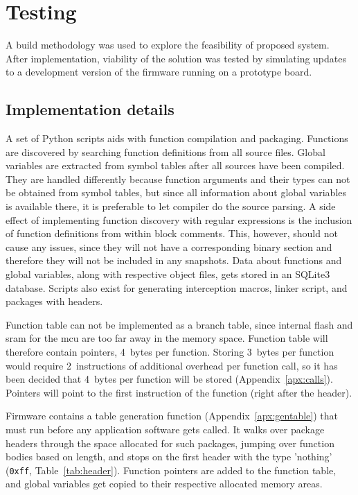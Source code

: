\newpage
\section{Testing}
\label{s:testing}

A build methodology was used to explore the feasibility of proposed system. After implementation, viability of the solution was tested by simulating updates to a development version of the firmware running on a prototype board.

\subsection{Implementation details}

A set of Python scripts aids with function compilation and packaging. Functions are discovered by searching function definitions from all source files. Global variables are extracted from symbol tables after all sources have been compiled. They are handled differently because function arguments and their types can not be obtained from symbol tables, but since all information about global variables is available there, it is preferable to let compiler do the source parsing. A side effect of implementing function discovery with regular expressions is the inclusion of function definitions from within block comments. This, however, should not cause any issues, since they will not have a corresponding binary section and therefore they will not be included in any snapshots. Data about functions and global variables, along with respective object files, gets stored in an SQLite3 database. Scripts also exist for generating interception macros, linker script, and packages with headers.

Function table can not be implemented as a branch table, since internal flash and \gls{sram} for the \gls{mcu} are too far away in the memory space. Function table will therefore contain pointers, 4~bytes per function. Storing 3~bytes per function would require 2~instructions of additional overhead per function call, so it has been decided that 4~bytes per function will be stored (Appendix~\ref{apx:calls}). Pointers will point to the first instruction of the function (right after the header).

Firmware contains a table generation function (Appendix~\ref{apx:gentable}) that must run before any application software gets called. It walks over package headers through the space allocated for such packages, jumping over function bodies based on length, and stops on the first header with the type 'nothing' (\texttt{0xff}, Table~\ref{tab:header}). Function pointers are added to the function table, and global variables get copied to their respective allocated memory areas.

